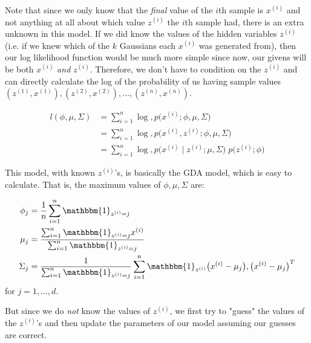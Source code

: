   \begin{example}
    Note that since we only know that the \textit{final} value of the $i$th sample is $x^{(i)}$ and not anything at all about which value $z^{(i)}$ the $i$th sample had, there is an extra unknown in this model. If we did know the values of the hidden variables $z^{(i)}$ (i.e. if we knew which of the $k$ Gaussians each $x^{(i)}$ was generated from), then our log likelihood function would be much more simple since now, our givens will be both $x^{(i)}$ \textit{and} $z^{(i)}$. Therefore, we don't have to condition on the $z^{(i)}$ and can directly calculate the log of the probability of us having sample values $(z^{(1)}, x^{(1)}), (z^{(2)}, x^{(2)}), \ldots, (z^{(n)}, x^{(n)})$.

    \begin{align*}
      l(\phi, \mu, \Sigma) & = \sum_{i=1}^n \log , p\big( x^{(i)}; \phi, \mu ,\Sigma\big) \\
      & = \sum_{i=1}^n \log, p\big( x^{(i)}, z^{(i)}; \phi, \mu ,\Sigma\big) \\
      & = \sum_{i=1}^n \log, p\big( x^{(i)} \mid z^{(i)}; \mu, \Sigma) \; p\big( z^{(i)}; \phi \big)
    \end{align*}

    This model, with known $z^{(i)}$'s, is basically the GDA model, which is easy to calculate. That is, the maximum values of $\phi, \mu, \Sigma$ are:

    \begin{align*}
      \phi_j & = \frac{1}{n} \sum_{i=1}^n \mathbbm{1}_{z^{(i)} = j} \\
      \mu_j & = \frac{\sum_{i=1}^n \mathbbm{1}_{z^{(i)} = j} x^{(i)}}{\sum_{i=1}^n \mathbbm{1}_{z^{(i)} = j}} \\
      \Sigma_j & = \frac{1}{\sum_{i=1}^n \mathbbm{1}_{z^{(i)} = j}} \sum_{i=1}^n \mathbbm{1}_{z^{(i)}} \big( x^{(i)} - \mu_j \big),\big(x^{(i)} - \mu_j \big)^T
    \end{align*}
    for $j = 1, \ldots, d$. 
  \end{example}

  But since we do \textit{not} know the values of $z^{(i)}$, we first try to "guess" the values of the $z^{(i)}$'s and then update the parameters of our model assuming our guesses are correct. 

